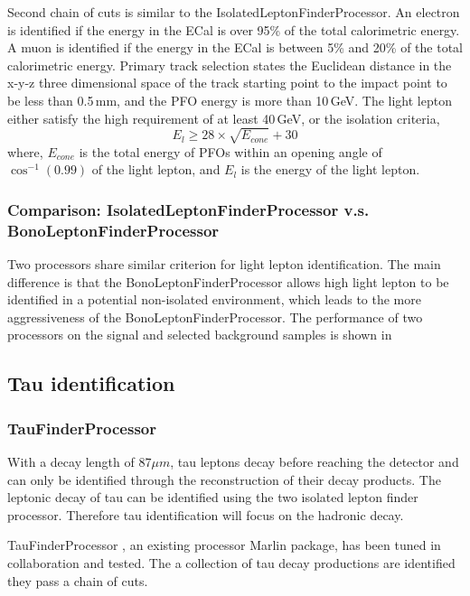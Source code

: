 Second chain of cuts is similar to the IsolatedLeptonFinderProcessor. An electron is identified if the energy in the ECal is over 95\% of the total calorimetric energy. A muon is identified if the energy in the ECal is between 5\% and 20\% of the total calorimetric energy. Primary track selection states the Euclidean distance in the x-y-z three dimensional space of the track starting point to the impact point to be less than 0.5\,mm, and the PFO energy is more than 10\,GeV. The light lepton either satisfy the high \pT requirement of at least 40\,GeV, or the isolation criteria,
\begin{equation}
E_{l} \geqslant 28 \times \sqrt{E_{cone}} + 30
\end{equation}
where, $E_{cone}$ is the total energy of PFOs within an opening angle of $\cos^{-1}(0.99)$ of the light lepton, and $E_{l}$ is the energy of the light lepton.

\subsubsection{Comparison: IsolatedLeptonFinderProcessor v.s. BonoLeptonFinderProcessor}

Two processors share similar criterion for light lepton identification. The main difference is that the BonoLeptonFinderProcessor allows high \pT light lepton to be identified in a potential non-isolated environment, which leads to the more aggressiveness of the BonoLeptonFinderProcessor. The performance of two processors on the signal and selected background samples is shown in 

\subsection{Tau identification}

\subsubsection{TauFinderProcessor}

With a decay length of 87$\mu{m}$, tau leptons decay before reaching the detector and can only be identified through the reconstruction of their decay products. The leptonic decay of tau can be identified using the two isolated lepton finder processor. Therefore tau identification will focus on the hadronic decay.

TauFinderProcessor \cite{LCD-Note-2010-009}, an existing processor Marlin package, has been tuned in collaboration and tested. The a collection of tau decay productions are identified they pass a chain of cuts.

